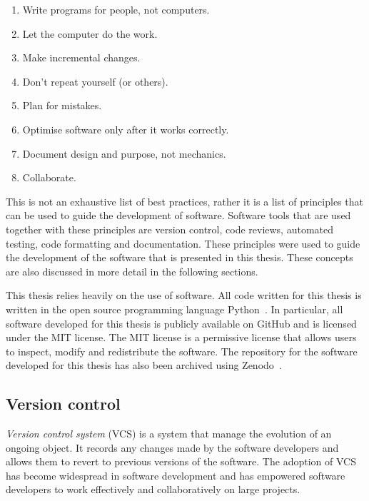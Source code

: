 \begin{enumerate}
    \item Write programs for people, not computers. \label{best_practice_1}
    \item Let the computer do the work. \label{best_practice_2}
    \item Make incremental changes. \label{best_practice_3}
    \item Don't repeat yourself (or others). \label{best_practice_4}
    \item Plan for mistakes. \label{best_practice_5}
    \item Optimise software only after it works correctly.
    \label{best_practice_6}
    \item Document design and purpose, not mechanics. \label{best_practice_7}
    \item Collaborate. \label{best_practice_8}
\end{enumerate}

This is not an exhaustive list of best practices, rather it is a list of
principles that can be used to guide the development of software.
Software tools that are used together with these principles are version control,
code reviews, automated testing, code formatting and documentation.
These principles were used to guide the development of the software that is
presented in this thesis.
These concepts are also discussed in more detail in the following sections.

This thesis relies heavily on the use of software.
All code written for this thesis is written in the open source programming
language Python~\cite{van1995python}.
In particular, all software developed for this thesis is publicly available on
GitHub and is licensed under the MIT license.
The MIT license is a permissive license that allows users to inspect, modify
and redistribute the software.
The repository for the software developed for this thesis has also been
archived using Zenodo~\cite{ambulance_game_github_repo}.


\subsection{Version control}

\textit{Version control system} (VCS) is a system that manage the evolution of
an ongoing object.
It records any changes made by the software developers and allows them to
revert to previous versions of the software.
The adoption of VCS has become widespread in software development and has
empowered software developers to work effectively and collaboratively on large
projects.

